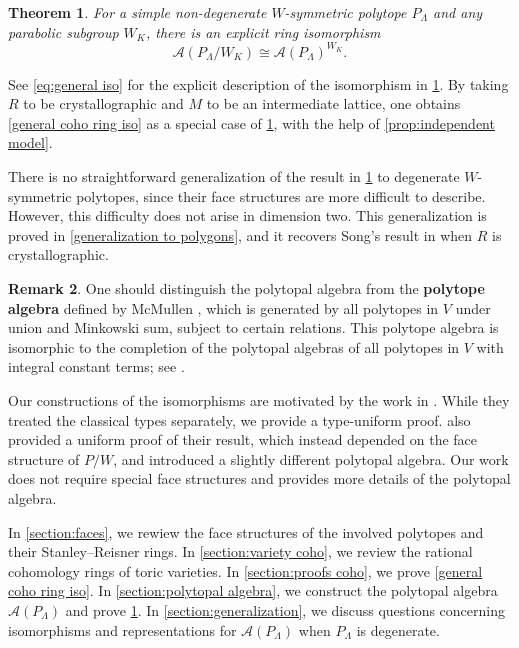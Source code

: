 \documentclass{amsart}
\theoremstyle{plain} \numberwithin{equation}{section}
\newtheorem{theorem}{Theorem}[section]
\theoremstyle{definition}
\newtheorem{remark}[theorem]{Remark}
\begin{document}
\begin{theorem}\label{general ana ring iso}
  For a simple non-degenerate $W$-symmetric polytope $P_{\Lambda}$ and any parabolic subgroup $W_K$, there is an explicit ring isomorphism
  $$\mathcal{A}(P_{\Lambda}/W_K)\cong \mathcal{A}(P_{\Lambda})^{W_K}.$$
\end{theorem}


See \cref{eq:general iso} for the explicit description of the isomorphism in \cref{general ana ring iso}.
By taking $R$ to be crystallographic and $M$ to be an intermediate lattice, one obtains \cref{general coho ring iso} as a special case of \cref{general ana ring iso}, with the help of \cref{prop:independent model}.


There is no straightforward generalization of the result in \cref{general ana ring iso} to degenerate $W$-symmetric polytopes, since their face structures are more difficult to describe.
However, this difficulty does not arise in dimension two. 
This generalization is proved in \cref{generalization to polygons}, and it recovers Song's result in \cite{songToricSurfacesReflection2022} when $R$ is crystallographic.






\begin{remark}
  One should distinguish the polytopal algebra from the \textbf{polytope algebra}  defined by McMullen \cite{mcmullenPolytopeAlgebra1989}, which is generated by all polytopes in $V$ under union and Minkowski sum, subject to certain relations.  This polytope algebra  is isomorphic to the completion of the polytopal algebras of all polytopes in $V$ with integral constant terms; see \cite{brionStructurePolytopeAlgebra1997}.
\end{remark}



Our constructions of the isomorphisms are motivated by the work in \cite{horiguchiToricOrbifoldsAssociated2024}.
While they treated the classical types separately, we provide a type-uniform proof.
\cite{guiWeylGroupSymmetries2025} also provided a uniform proof of their result, which instead depended on the face structure of $P/W$, and introduced a slightly different polytopal algebra.
Our work does not require special face structures and provides more details of the polytopal algebra.



In \cref{section:faces}, we rewiew the face structures of the involved polytopes and their Stanley--Reisner rings.
In \cref{section:variety coho}, we review the rational cohomology rings of toric varieties.
In \cref{section:proofs coho}, we prove \cref{general coho ring iso}.
In \cref{section:polytopal algebra}, we construct the  polytopal algebra $\mathcal{A}(P_{\Lambda})$ and prove \cref{general ana ring iso}.
In \cref{section:generalization}, we discuss questions concerning isomorphisms and representations for $\mathcal{A}(P_{\Lambda})$ when $P_{\Lambda}$ is degenerate.
\end{document}
